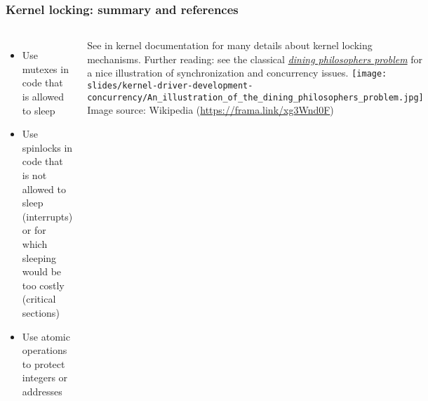 \begin{frame}
  \frametitle{Kernel locking: summary and references}
  \begin{columns}
    \begin{itemize}
    \item Use mutexes in code that is allowed to sleep
    \item Use spinlocks in code that is not allowed to sleep (interrupts)
      or for which sleeping would be too costly (critical sections)
    \item Use atomic operations to protect integers or addresses
    \end{itemize}
    See  in kernel documentation
    for many details about kernel locking mechanisms.
    \small
    Further reading: see the classical
    {\em \href{https://en.wikipedia.org/wiki/Dining_philosophers_problem}
    {dining philosophers problem}} for a nice illustration of synchronization
    and concurrency issues.
    \texttt{[image: slides/kernel-driver-development-concurrency/An\_illustration\_of\_the\_dining\_philosophers\_problem.jpg]}
    \tiny Image source: Wikipedia (\url{https://frama.link/xg3Wnd0F})
  \end{columns}
\end{frame}
